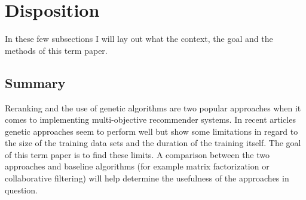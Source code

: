 
\large

\chapter{Disposition}
\label{chp:disposition}

In these few subsections I will lay out what the context, the goal and the methods of this term paper.

\section{Summary}
Reranking and the use of genetic algorithms are two popular approaches when it comes to implementing  multi-objective recommender systems. In recent articles genetic approaches seem to perform well but show some limitations in regard to the size of the training data sets and the duration of the training itself. The goal of this term paper is to find these limits. A comparison between the two approaches and baseline algorithms (for example matrix factorization or collaborative filtering) will help determine the usefulness of the approaches in question.

